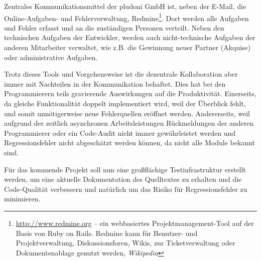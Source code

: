 Zentrales Kommunikationsmittel der pludoni GmbH ist, neben der E-Mail, die Online-Aufgaben- und Fehlerverwaltung, Redmine\footnote{\url{http://www.redmine.org} -- ein webbasiertes Projektmanagement-Tool auf der Basis von Ruby on Rails. Redmine kann für Benutzer- und Projektverwaltung, Diskussionsforen, Wikis, zur Ticketverwaltung oder Dokumentenablage genutzt werden, \textit{Wikipedia}}. Dort werden alle Aufgaben und Fehler erfasst und an die zuständigen Personen verteilt. 
Neben den technischen Aufgaben der Entwickler, werden auch nicht-technische Aufgaben der anderen Mitarbeiter verwaltet, wie z.B. die Gewinnung neuer Partner (Akquise) oder administrative Aufgaben. 

Trotz dieses Tools und Vorgehensweise ist die dezentrale Kollaboration aber immer mit Nachteilen in der Kommunikation behaftet. Dies hat bei den Programmierern teils gravierende Auswirkungen auf die Produktivität. Einerseits, da gleiche Funktionalität doppelt implementiert wird, weil der Überblick fehlt, und somit unnötigerweise neue Fehlerquellen eröffnet werden. Andererseits, weil aufgrund der zeitlich asynchronen Arbeitsleistungen Rückmeldungen der anderen Programmierer oder ein Code-Audit nicht immer gewährleistet werden und Regressionsfehler nicht abgeschätzt werden können, da nicht alle Module bekannt sind.


Für das kommende Projekt soll nun eine großflächige Testinfrastruktur erstellt werden, um eine aktuelle Dokumentation des Quelltextes zu erhalten und die Code-Qualität verbessern und natürlich um das Risiko für Regressionsfehler zu minimieren.
